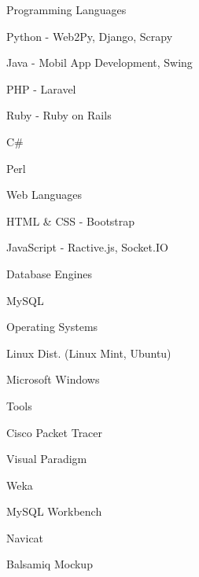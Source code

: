 \begin{cventries}
    \cventry
        {}
        {Programming Languages}
        {}
        {}
        {
            \begin{cvitems}
                \item {Python - Web2Py, Django, Scrapy}
                \item {Java - Mobil App Development, Swing}
                \item {PHP - Laravel}
                \item {Ruby - Ruby on Rails}
                \item {C\#}
                \item {Perl}
            \end{cvitems}
        }
    \cventry
        {}
        {Web Languages}
        {}
        {}
        {
            \begin{cvitems}
                \item{HTML \& CSS - Bootstrap }
                \item{JavaScript - Ractive.js, Socket.IO}
            \end{cvitems}
        }
    \cventry
        {}
        {Database Engines}
        {}
        {}
        {
            \begin{cvitems}
                \item{MySQL}
            \end{cvitems}
        }
    \cventry
        {}
        {Operating Systems}
        {}
        {}
        {
            \begin{cvitems}
                \item{Linux Dist. (Linux Mint, Ubuntu)}
                \item{Microsoft Windows}
            \end{cvitems}
        }
    \cventry
        {}
        {Tools}
        {}
        {}
        {
            \begin{cvitems}
                \item{Cisco Packet Tracer}
                \item{Visual Paradigm}
                \item{Weka}
                \item{MySQL Workbench}
                \item{Navicat}
                \item{Balsamiq Mockup}
            \end{cvitems}
        }
    \cventry

\end{cventries}

